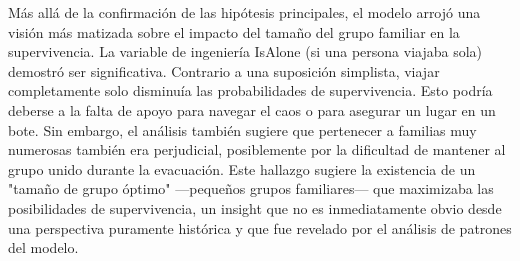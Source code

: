 \documentclass[conference]{IEEEtran}
\begin{document}
Más allá de la confirmación de las hipótesis principales, el modelo arrojó una visión más matizada sobre el impacto del tamaño del grupo familiar en la supervivencia. La variable de ingeniería IsAlone (si una persona viajaba sola) demostró ser significativa. Contrario a una suposición simplista, viajar completamente solo disminuía las probabilidades de supervivencia. Esto podría deberse a la falta de apoyo para navegar el caos o para asegurar un lugar en un bote. Sin embargo, el análisis también sugiere que pertenecer a familias muy numerosas también era perjudicial, posiblemente por la dificultad de mantener al grupo unido durante la evacuación. Este hallazgo sugiere la existencia de un "tamaño de grupo óptimo" —pequeños grupos familiares— que maximizaba las posibilidades de supervivencia, un insight que no es inmediatamente obvio desde una perspectiva puramente histórica y que fue revelado por el análisis de patrones del modelo.
\end{document}

